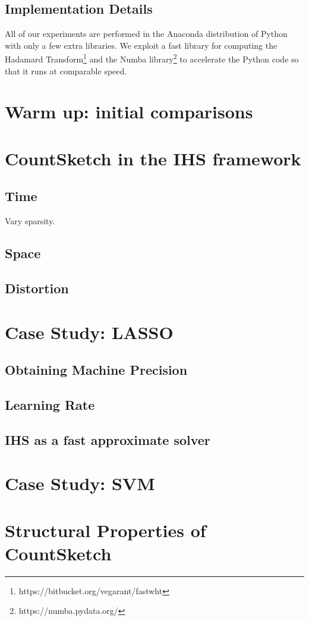 \documentclass[twoside]{article}
\theoremstyle{definition}\newtheorem{thm}{Theorem}[section]
\theoremstyle{definition}\newtheorem{mydef}[thm]{Definition}
\theoremstyle{definition}\newtheorem{rem}[thm]{Remark}
\theoremstyle{definition}\newtheorem{prop}[thm]{Proposition}
\theoremstyle{definition}\newtheorem{example}[thm]{Example}
\theoremstyle{definition}\newtheorem{claim}[thm]{Claim}
\theoremstyle{definition}\newtheorem{Qu}[thm]{Question}
\theoremstyle{definition}\newtheorem{Lemma}[thm]{Lemma}
\theoremstyle{definition}\newtheorem{Cor}[thm]{Corollary}
\theoremstyle{definition}\newtheorem{Fact}[]{Fact}
\begin{document}
\subsection{Implementation Details}

All of our experiments are performed in the Anaconda distribution of Python
with only a few extra libraries.
We exploit a fast library for computing the Hadamard
Transform\footnote{https://bitbucket.org/vegarant/fastwht} and the Numba
library\footnote{https://numba.pydata.org/} to accelerate the Python code
so that it runs at comparable speed.



\section{Warm up: initial comparisons}




\section{CountSketch in the IHS framework} \label{sec: countsketch-ihs}





\subsection{Time}
Vary sparsity.
\subsection{Space}

\subsection{Distortion}



\section{Case Study: LASSO}

\subsection{Obtaining Machine Precision}

\subsection{Learning Rate}

\subsection{IHS as a fast approximate solver}

\section{Case Study: SVM}


\appendix

\section{Structural Properties of CountSketch} \label{sec: countsketch-proofs}







\end{document}
